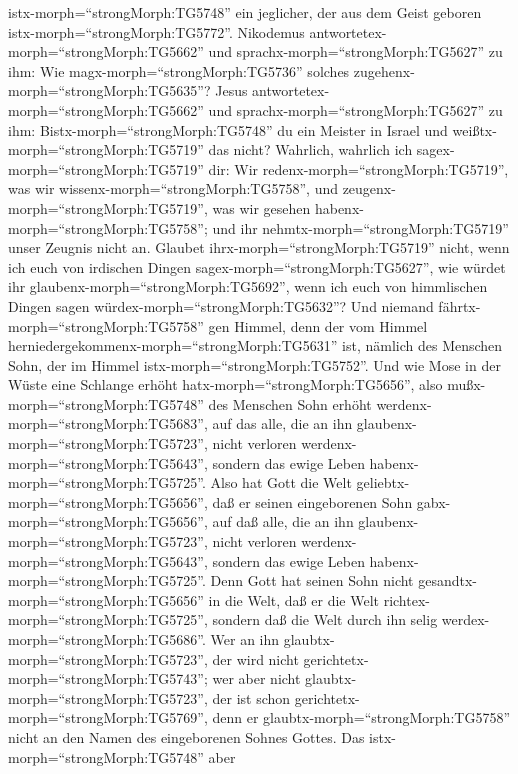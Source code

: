 istx-morph=``strongMorph:TG5748'' ein jeglicher, der aus dem Geist
geboren istx-morph=``strongMorph:TG5772''.  Nikodemus
antwortetex-morph=``strongMorph:TG5662'' und
sprachx-morph=``strongMorph:TG5627'' zu ihm: Wie
magx-morph=``strongMorph:TG5736'' solches
zugehenx-morph=``strongMorph:TG5635''?  Jesus
antwortetex-morph=``strongMorph:TG5662'' und
sprachx-morph=``strongMorph:TG5627'' zu ihm:
Bistx-morph=``strongMorph:TG5748'' du ein Meister in Israel und
weißtx-morph=``strongMorph:TG5719'' das nicht?  Wahrlich,
wahrlich ich sagex-morph=``strongMorph:TG5719'' dir: Wir
redenx-morph=``strongMorph:TG5719'', was wir
wissenx-morph=``strongMorph:TG5758'', und
zeugenx-morph=``strongMorph:TG5719'', was wir gesehen
habenx-morph=``strongMorph:TG5758''; und ihr
nehmtx-morph=``strongMorph:TG5719'' unser Zeugnis nicht an.
 Glaubet ihrx-morph=``strongMorph:TG5719'' nicht, wenn ich
euch von irdischen Dingen sagex-morph=``strongMorph:TG5627'', wie würdet
ihr glaubenx-morph=``strongMorph:TG5692'', wenn ich euch von himmlischen
Dingen sagen würdex-morph=``strongMorph:TG5632''?  Und
niemand fährtx-morph=``strongMorph:TG5758'' gen Himmel, denn der vom
Himmel herniedergekommenx-morph=``strongMorph:TG5631'' ist, nämlich des
Menschen Sohn, der im Himmel istx-morph=``strongMorph:TG5752''.
 Und wie Mose in der Wüste eine Schlange erhöht
hatx-morph=``strongMorph:TG5656'', also
mußx-morph=``strongMorph:TG5748'' des Menschen Sohn erhöht
werdenx-morph=``strongMorph:TG5683'',  auf das alle, die an
ihn glaubenx-morph=``strongMorph:TG5723'', nicht verloren
werdenx-morph=``strongMorph:TG5643'', sondern das ewige Leben
habenx-morph=``strongMorph:TG5725''.  Also hat Gott die
Welt geliebtx-morph=``strongMorph:TG5656'', daß er seinen eingeborenen
Sohn gabx-morph=``strongMorph:TG5656'', auf daß alle, die an ihn
glaubenx-morph=``strongMorph:TG5723'', nicht verloren
werdenx-morph=``strongMorph:TG5643'', sondern das ewige Leben
habenx-morph=``strongMorph:TG5725''.  Denn Gott hat seinen
Sohn nicht gesandtx-morph=``strongMorph:TG5656'' in die Welt, daß er die
Welt richtex-morph=``strongMorph:TG5725'', sondern daß die Welt durch
ihn selig werdex-morph=``strongMorph:TG5686''.  Wer an ihn
glaubtx-morph=``strongMorph:TG5723'', der wird nicht
gerichtetx-morph=``strongMorph:TG5743''; wer aber nicht
glaubtx-morph=``strongMorph:TG5723'', der ist schon
gerichtetx-morph=``strongMorph:TG5769'', denn er
glaubtx-morph=``strongMorph:TG5758'' nicht an den Namen des eingeborenen
Sohnes Gottes.  Das istx-morph=``strongMorph:TG5748'' aber
